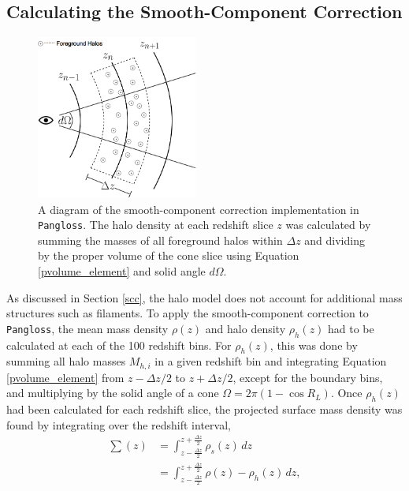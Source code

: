 \documentclass[%
 reprint,
 amsmath,amssymb,
 aps,nofootinbib
]{revtex4-1}
\begin{document}
\subsection{Calculating the Smooth-Component Correction} \label{calc_scc}

\begin{figure}
    \centering
    \includegraphics[width=0.475\textwidth]{figs-swe/thesis/smooth_correction.png}
    \captionsetup{justification=raggedright,singlelinecheck=false}
    \caption{A diagram of the smooth-component correction implementation in \texttt{Pangloss}. The halo density at each redshift slice $z$ was calculated by summing the masses of all foreground halos within $\Delta z$ and dividing by the proper volume of the cone slice using Equation \eqref{pvolume_element} and solid angle $d\Omega$.}
    \label{fig:scc}
\end{figure}

As discussed in Section \ref{scc}, the halo model does not account for additional mass structures such as filaments. To apply the smooth-component correction to \texttt{Pangloss}, the mean mass density $\rho(z)$ and halo density $\rho_h(z)$ had to be calculated at each of the 100 redshift bins. For $\rho_h(z)$, this was done by summing all halo masses $M_{h,i}$ in a given redshift bin and integrating Equation \eqref{pvolume_element} from ${z-\Delta z/2}$ to ${z+\Delta z/2}$, except for the boundary bins, and multiplying by the solid angle of a cone ${\Omega=2\pi(1-\cos R_L)}$. Once $\rho_h(z)$ had been calculated for each redshift slice, the projected surface mass density was found by integrating over the redshift interval,
\begin{align}\label{surface_density} 
\sum(z)&=\int_{z-\frac{\Delta z}{2}}^{z+\frac{\Delta z}{2}} \rho_s(z)\,dz\nonumber\\
&=\int_{z-\frac{\Delta z}{2}}^{z+\frac{\Delta z}{2}} \rho(z)-\rho_h(z)\,dz,
\end{align}
\end{document}
